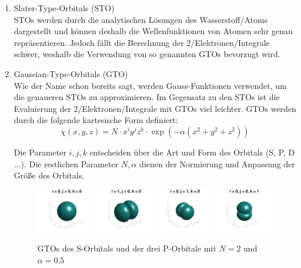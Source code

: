 \begin{enumerate}
    \item Slater-Type-Orbitals (STO)\\
    STOs werden durch die analytischen Lösungen des Wasserstoff\-/Atoms dargestellt
    und können deshalb die Wellenfunktionen von Atomen sehr genau repräsentieren.
    Jedoch fällt die Berechnung der 2\-/Elektronen\-/Integrale schwer,
    weshalb die Verwendung von so genannten GTOs bevorzugt wird.

    \cite[Ab. 5.2]{cramer_2004}
    \cite[S. 2]{tc2_6}

    \item Gaussian-Type-Orbitals (GTO)\\
    Wie der Name schon bereits sagt, werden Gauss-Funktionen verwendet,
    um die genaueren STOs zu approximieren. Im Gegensatz zu den STOs ist
    die Evaluierung der 2\-/Elektronen\-/Integrale mit GTOs viel leichter.
    GTOs werden durch die folgende kartesische Form definiert:\\
    \begin{equation}
        \chi(x,y,z) = N \cdot x^i y^j z^k \cdot \exp (-\alpha (x^2+y^2+z^2))
    \end{equation}

    Die Parameter $i,j,k$ entscheiden über die Art und Form des Orbitals (S, P, D ...).
    Die restlichen Parameter $N, \alpha$ dienen der Normierung und Anpassung der Größe des Orbitals.

    \begin{figure}[h]
        \includegraphics[trim=50 0 50 0, clip, width=0.24\textwidth]{res/GTOs/ao_0_0_0.png}
        \includegraphics[trim=50 0 50 0, clip, width=0.24\textwidth]{res/GTOs/ao_1_0_0.png}
        \includegraphics[trim=50 0 50 0, clip, width=0.24\textwidth]{res/GTOs/ao_0_1_0.png}
        \includegraphics[trim=50 0 50 0, clip, width=0.24\textwidth]{res/GTOs/ao_0_0_1.png}
        \caption{GTOs des S-Orbitals und der drei P-Orbitale mit $N=2$ und $\alpha = 0.5$}
    \end{figure}


\end{enumerate}

